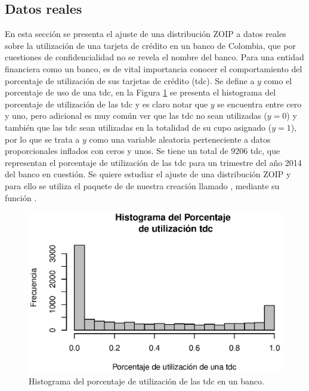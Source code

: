 \subsection{Datos reales}
En esta secci\'{o}n se presenta el ajuste de una distribuci\'{o}n ZOIP a datos reales sobre la utilizaci\'{o}n de una tarjeta de cr\'{e}dito en un banco de Colombia, que por cuestiones de confidencialidad no se revela el nombre del banco. Para una entidad financiera como un banco, es de vital importancia conocer el comportamiento del porcentaje de utilizaci\'{o}n de sus tarjetas de cr\'{e}dito (tdc). Se define a $y$ como el porcentaje de uso de una tdc, en la Figura \ref{hist_tdc} se presenta el histograma del porcentaje de utilizaci\'{o}n de las tdc y es claro notar que $y$ se encuentra entre cero y uno, pero adicional es muy com\'{u}n ver que las tdc no sean utilizadas ($y=0$) y tambi\'{e}n que las tdc sean utilizadas en la totalidad de su cupo asignado ($y=1$), por lo que se trata a $y$ como una variable aleatoria perteneciente a datos proporcionales inflados con ceros y unos. Se tiene un total de $9206$ tdc, que representan el porcentaje de utilizaci\'{o}n de las tdc para un trimestre del a\~{n}o 2014 del banco en cuesti\'{o}n. Se quiere estudiar el ajuste de una distribuci\'{o}n ZOIP y para ello se utiliza el paquete de  de nuestra creaci\'{o}n llamado , mediante su funci\'{o}n .\\

\begin{figure}
	\begin{center}
		\includegraphics[scale=0.6]{Hist_tdc.eps}
		\caption{Histograma del porcentaje de utilizaci\'{o}n de las tdc en un banco.}
		\label{hist_tdc}
	\end{center}
\end{figure}

